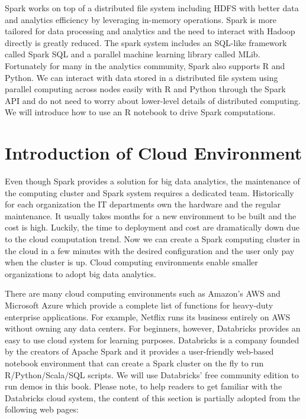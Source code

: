 \documentclass[12pt,]{krantz}
\begin{document}
Spark works on top of a distributed file system including HDFS with better data and analytics efficiency by leveraging in-memory operations. Spark is more tailored for data processing and analytics and the need to interact with Hadoop directly is greatly reduced. The spark system includes an SQL-like framework called Spark SQL and a parallel machine learning library called MLib. Fortunately for many in the analytics community, Spark also supports R and Python. We can interact with data stored in a distributed file system using parallel computing across nodes easily with R and Python through the Spark API and do not need to worry about lower-level details of distributed computing. We will introduce how to use an R notebook to drive Spark computations.

\hypertarget{introduction-of-cloud-environment}{%
\section{Introduction of Cloud Environment}\label{introduction-of-cloud-environment}}

Even though Spark provides a solution for big data analytics, the maintenance of the computing cluster and Spark system requires a dedicated team. Historically for each organization the IT departments own the hardware and the regular maintenance. It usually takes months for a new environment to be built and the cost is high. Luckily, the time to deployment and cost are dramatically down due to the cloud computation trend. Now we can create a Spark computing cluster in the cloud in a few minutes with the desired configuration and the user only pay when the cluster is up. Cloud computing environments enable smaller organizations to adopt big data analytics.

There are many cloud computing environments such as Amazon's AWS and Microsoft Azure which provide a complete list of functions for heavy-duty enterprise applications. For example, Netflix runs its business entirely on AWS without owning any data centers. For beginners, however, Databricks provides an easy to use cloud system for learning purposes. Databricks is a company founded by the creators of Apache Spark and it provides a user-friendly web-based notebook environment that can create a Spark cluster on the fly to run R/Python/Scala/SQL scripts. We will use Databricks' free community edition to run demos in this book. Please note, to help readers to get familiar with the Databricks cloud system, the content of this section is partially adopted from the following web pages:
\end{document}
